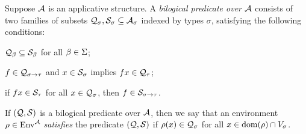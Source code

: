 \begin{comment}
\begin{lem} \label{lem:submodel-to-log-pred}

\end{lem}

\begin{prop}
Suppose $\struct{A}$ is a model. Then there is a bijection between logical predicates over $\struct{A}$ and submodels of $\struct{A}$.
\begin{proof}
Corollary of lemmas \ref{lem:log-pred-to-submodel} and \ref{lem:submodel-to-log-pred}.
\end{proof}
\end{prop}
\end{comment}


\begin{defn} \label{def:bilog-rel}
Suppose $\struct{A}$ is an applicative structure. A \emph{bilogical predicate over $\struct{A}$} consists of two families of subsets $\scomp{\struct{Q}}{\sigma}, \scomp{\struct{S}}{\sigma} \subs \scomp{\struct{A}}{\sigma}$ indexed by types $\sigma$, satisfying the following conditions:
\begin{enum}
\item $\scomp{\struct{Q}}{\beta} \subs \scomp{\struct{S}}{\beta}$ for all $\beta \in \Basetypes$;
\item $f \in \scomp{\struct{Q}}{\functy{\sigma}{\tau}}$ and $x \in \scomp{\struct{S}}{\sigma}$ implies $f x \in \scomp{\struct{Q}}{\tau}$;
\item if $f x \in \scomp{\struct{S}}{\tau}$ for all $x \in \scomp{\struct{Q}}{\sigma}$, then $f \in \scomp{\struct{S}}{\functy{\sigma}{\tau}}$.
\end{enum}
\end{defn}

\begin{defn}
If $(\struct{Q}, \struct{S})$ is a bilogical predicate over $\struct{A}$, then we say that an environment $\rho \in \Env[][\struct{A}]$ \emph{satisfies} the predicate $(\struct{Q}, \struct{S})$ if $\rho(x) \in \scomp{\struct{Q}}{\sigma}$ for all $x \in \dom{\rho} \cap \Var[\sigma]$.
\end{defn}

